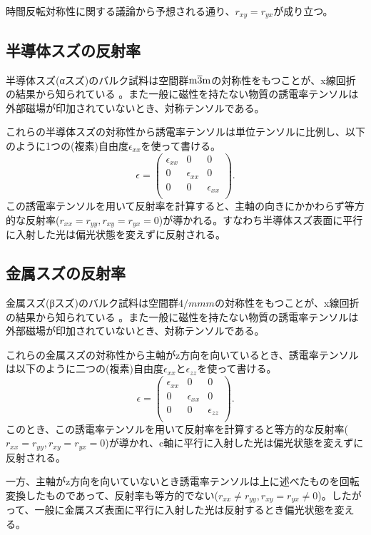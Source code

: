 時間反転対称性に関する議論から予想される通り、$r_{xy}=r_{yx}$が成り立つ。

\subsection{半導体スズの反射率}
\label{sec:reflectance_alpha}
半導体スズ(αスズ)のバルク試料は空間群$\rm m\overline{3}m$の対称性をもつことが、x線回折の結果から知られている \cite{THEWLIS}。また一般に磁性を持たない物質の誘電率テンソルは外部磁場が印加されていないとき、対称テンソルである\cite{landau}。

これらの半導体スズの対称性から誘電率テンソルは単位テンソルに比例し、以下のように1つの(複素)自由度$\epsilon_{xx}$を使って書ける。
\[
  \epsilon = \left(
    \begin{array}{ccc}
      \epsilon_{xx} & 0 & 0 \\
      0 & \epsilon_{xx} & 0\\
      0 & 0 & \epsilon_{xx} \\
    \end{array}
  \right).
\]
この誘電率テンソルを用いて反射率を計算すると、主軸の向きにかかわらず等方的な反射率($r_{xx}=r_{yy}, r_{xy}=r_{yx}=0$)が導かれる。すなわち半導体スズ表面に平行に入射した光は偏光状態を変えずに反射される。

\subsection{金属スズの反射率}
\label{sec:reflectance_beta}
金属スズ(βスズ)のバルク試料は空間群$4/mmm$の対称性をもつことが、x線回折の結果から知られている \cite{Wolcyrz}。また一般に磁性を持たない物質の誘電率テンソルは外部磁場が印加されていないとき、対称テンソルである\cite{landau}。

これらの金属スズの対称性から主軸がz方向を向いているとき、誘電率テンソルは以下のように二つの(複素)自由度$\epsilon_{xx}$と$\epsilon_{zz}$を使って書ける。
\[
  \epsilon = \left(
    \begin{array}{ccc}
      \epsilon_{xx} & 0 & 0 \\
      0 & \epsilon_{xx} & 0\\
      0 & 0 & \epsilon_{zz} \\
    \end{array}
  \right).
\]
このとき、この誘電率テンソルを用いて反射率を計算すると等方的な反射率($r_{xx}=r_{yy}, r_{xy}=r_{yx}=0$)が導かれ、c軸に平行に入射した光は偏光状態を変えずに反射される。

一方、主軸がz方向を向いていないとき誘電率テンソルは上に述べたものを回転変換したものであって、反射率も等方的でない($r_{xx}\neq r_{yy}, r_{xy}=r_{yx}\neq0$)。したがって、一般に金属スズ表面に平行に入射した光は反射するとき偏光状態を変える。



